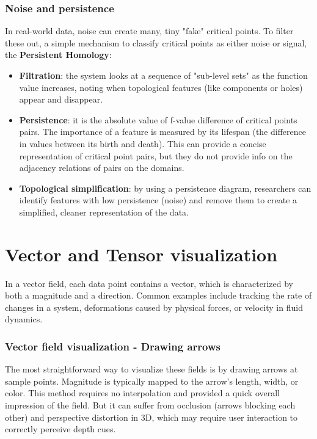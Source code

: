 \subsubsection{Noise and persistence}
In real-world data, noise can create many, tiny "fake" critical points. To filter these out, a simple mechanism to classify critical points as either noise or signal, the \textbf{Persistent Homology}:
\begin{itemize}[noitemsep]
    \item \textbf{Filtration}: the system looks at a sequence of "sub-level sets" as the function value increases, noting when topological features (like components or holes) appear and disappear.
    \item \textbf{Persistence}: it is the absolute value of f-value difference of critical points pairs. The importance of a feature is measured by its lifespan (the difference in values between its birth and death). This can provide a concise representation of critical point pairs, but they do not provide info on the adjacency relations of pairs on the domains.
    \item \textbf{Topological simplification}: by using a persistence diagram, researchers can identify features with low persistence (noise) and remove them to create a simplified, cleaner representation of the data.
\end{itemize}

\section{Vector and Tensor visualization}
In a vector field, each data point contains a vector, which is characterized by both a magnitude and a direction. Common examples include tracking the rate of changes in a system, deformations caused by physical forces, or velocity in fluid dynamics. 

\subsubsection{Vector field visualization - Drawing arrows}
The most straightforward way to visualize these fields is by drawing arrows at sample points. Magnitude is typically mapped to the arrow's length, width, or color. This method requires no interpolation and provided a quick overall impression of the field. But it can suffer from occlusion (arrows blocking each other) and perspective distortion in 3D, which may require user interaction to correctly perceive depth cues. 

